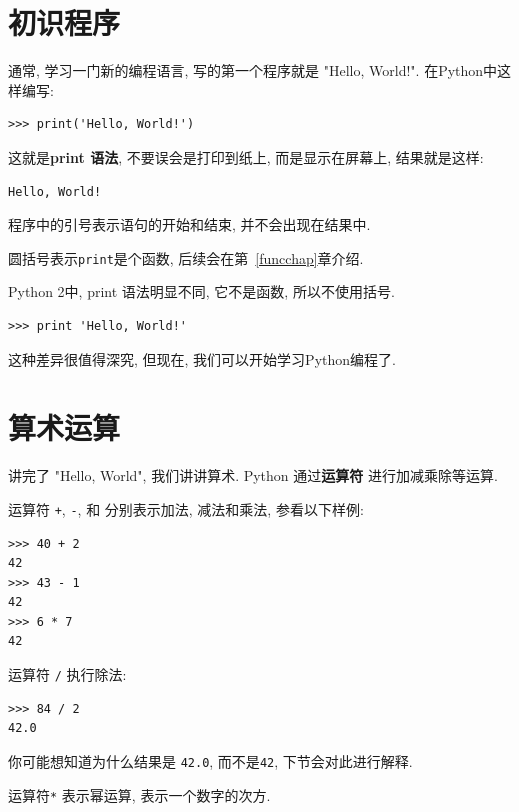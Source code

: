 \documentclass[10pt]{book}
\begin{document}
\section{初识程序}
\label{hello}

通常, 学习一门新的编程语言, 写的第一个程序就是 "Hello, World!". 
在Python中这样编写:

\begin{verbatim}
>>> print('Hello, World!')
\end{verbatim}
%

这就是{\bf print 语法}, 不要误会是打印到纸上, 而是显示在屏幕上, 
结果就是这样:

\begin{verbatim}
Hello, World!
\end{verbatim}
%

程序中的引号表示语句的开始和结束, 并不会出现在结果中. 

圆括号表示{\tt print}是个函数, 后续会在第~\ref{funcchap}章介绍. 
 

Python 2中, print 语法明显不同, 它不是函数, 所以不使用括号. 

\begin{verbatim}
>>> print 'Hello, World!'
\end{verbatim}
%
这种差异很值得深究, 
但现在, 我们可以开始学习Python编程了. 


\section{算术运算}

讲完了 "Hello, World", 我们讲讲算术. Python 通过{\bf 运算符} 
进行加减乘除等运算. 

运算符 {\tt +}, {\tt -}, 和 {\tt *} 分别表示加法, 减法和乘法, 参看以下样例:

\begin{verbatim}
>>> 40 + 2
42
>>> 43 - 1
42
>>> 6 * 7
42
\end{verbatim}
%
运算符 {\tt /} 执行除法:

\begin{verbatim}
>>> 84 / 2
42.0
\end{verbatim}
%

你可能想知道为什么结果是 {\tt 42.0}, 而不是{\tt 42}, 下节会对此进行解释. 

运算符{\tt **} 表示幂运算, 表示一个数字的次方. 
\end{document}
